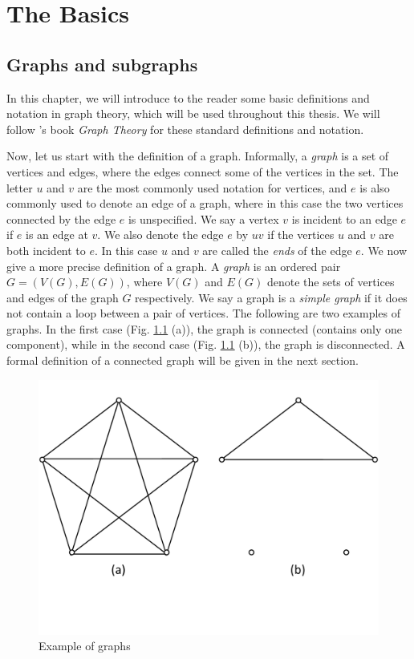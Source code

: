 \chapter{The Basics}
\section{Graphs and subgraphs}

In this chapter, we will introduce to the reader some basic definitions and notation in graph theory, which will be used throughout this thesis. We will follow \citeauthor{diestel00}'s book \textit{Graph Theory} for these standard definitions and notation.

Now, let us start with the definition of a graph. Informally, a \textit{graph} is a set of vertices and edges, where the edges connect some of the vertices in the set. The letter $u$ and $v$ are the most commonly used notation for vertices, and $e$ is also commonly used to denote an edge of a graph, where in this case the two vertices connected by the edge $e$ is unspecified. We say a vertex $v$ is incident to an edge $e$ if $e$ is an edge at $v$. We also denote the edge $e$ by $uv$ if the vertices $u$ and $v$ are both incident to $e$. In this case $u$ and $v$ are called the {\it {ends}} of the edge $e$. We now give a more precise definition of a graph. A {\it{graph}} is an ordered pair $G = (V(G), E(G))$, where $V(G)$ and $E(G)$ denote the sets of  vertices and edges of the graph $G$ respectively. We say a graph is a \emph{simple graph} if it does not contain a loop between a pair of vertices. The following are two examples of graphs. In the first case (Fig. \ref{graph} (a)), the graph is connected (contains only one component), while in the second case (Fig. \ref{graph} (b)), the graph is disconnected. A formal definition of a connected graph will be given in the next section. 
\begin{figure}
  \centering
    \includegraphics[scale=0.35]{../figures/fig2-1.pdf}
        \vspace{-30pt}
  \caption{Example of graphs}
  \label{graph}
\end{figure}

